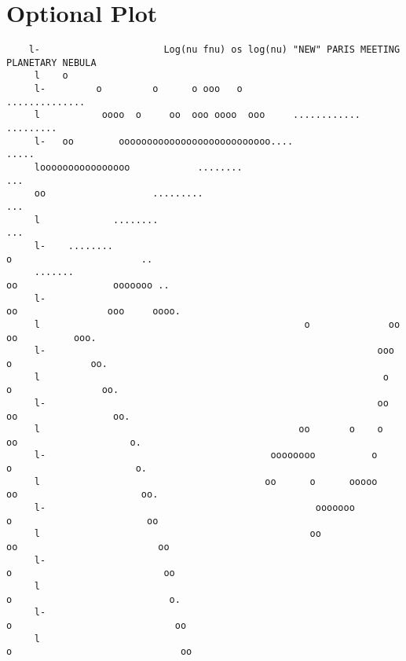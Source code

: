 \section{Optional Plot}
{\setverbatimfontsize{\tiny}
\begin{verbatim}
    l-                      Log(nu fnu) os log(nu) "NEW" PARIS MEETING PLANETARY NEBULA
     l    o
     l-         o         o      o ooo   o                     ..............
     l           oooo  o     oo  ooo oooo  ooo     ............             .........
     l-   oo        ooooooooooooooooooooooooooo....                                 .....
     loooooooooooooooo            ........                                              ...
     oo                   .........                                                        ...
     l             ........                                                                  ...
     l-    ........                                                    o                       ..
     .......                                                          oo                 ooooooo ..
     l-                                                              oo                ooo     oooo.
     l                                               o              oo                oo          ooo.
     l-                                                           ooo                o              oo.
     l                                                             o                o                oo.
     l-                                                           oo               oo                 oo.
     l                                              oo       o    o               oo                    o.
     l-                                        oooooooo          o                o                      o.
     l                                        oo      o      ooooo               oo                      oo.
     l-                                                ooooooo                   o                        oo
     l                                                oo                        oo                         oo
     l-                                                                         o                           oo
     l                                                                          o                            o.
     l-                                                                        o                             oo
     l                                                                         o                              oo

\end{verbatim}}
